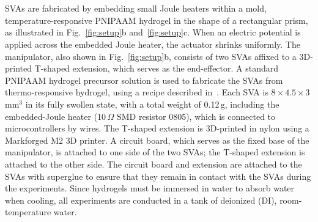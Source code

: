 \section{}

SVAs are fabricated by embedding small Joule heaters within a mold, temperature-responsive PNIPAAM hydrogel in the shape of a rectangular prism, as illustrated in Fig.~\ref{fig:setup}b and~\ref{fig:setup}c. When an electric potential is applied across the embedded Joule heater, the actuator shrinks uniformly. The manipulator, also shown in Fig.~\ref{fig:setup}b, consists of two SVAs affixed to a 3D-printed T-shaped extension, which serves as the end-effector. A standard PNIPAAM hydrogel precursor solution is used to fabricate the SVAs from thermo-responsive hydrogel, using a recipe described in~\cite{Khodambashi2021}. Each SVA is $8\times4.5\times3$\,mm$^3$ in its fully swollen state, with a total weight of 0.12\,g, including the embedded-Joule heater (10\,$\Omega$ SMD resistor 0805), which is connected to microcontrollers by wires. The T-shaped extension is 3D-printed in nylon using a Markforged M2 3D printer. 
A circuit board, which serves as the fixed base of the manipulator, is attached to one side of the two SVAs; the T-shaped extension is attached to the other side. The circuit board and extension are attached to the SVAs with superglue to ensure that they remain in contact with the SVAs during the experiments. Since hydrogels must be immersed in water to absorb water when cooling, all experiments are conducted in a tank of deionized (DI), room-temperature water.

\section{}

